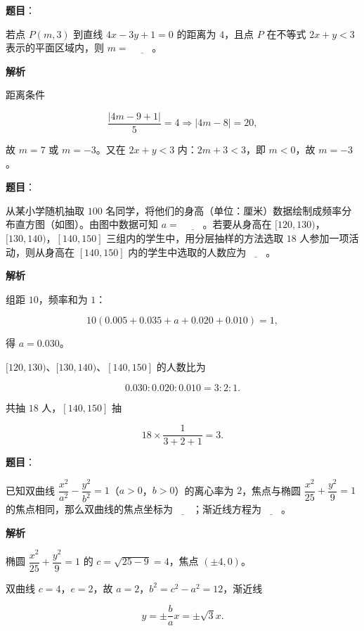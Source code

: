 \begin{answer}

\textbf{题目}：

若点 $P(m,3)$ 到直线 $4x-3y+1=0$ 的距离为 $4$，且点 $P$ 在不等式 $2x+y<3$ 表示的平面区域内，则 $m=$ $\underline{\qquad}$。

\textbf{解析}

距离条件

\nopagebreak[4]
\[\frac{|4m-9+1|}5=4\Longrightarrow|4m-8|=20,\]

故 $m=7$ 或 $m=-3$。又在 $2x+y<3$ 内：$2m+3<3$，即 $m<0$，故 $m=-3$。


\end{answer}
\begin{answer}

\textbf{题目}：

从某小学随机抽取 $100$ 名同学，将他们的身高（单位：厘米）数据绘制成频率分布直方图（如图）。由图中数据可知 $a=$ $\underline{\qquad}$。若要从身高在 $[120,130)$，$[130,140)$，$[140,150]$ 三组内的学生中，用分层抽样的方法选取 $18$ 人参加一项活动，则从身高在 $[140,150]$ 内的学生中选取的人数应为$\underline{\qquad}$。
\nopagebreak[4]
\begin{center}\end{center}
\nopagebreak[4]
\textbf{解析}

组距 $10$，频率和为 $1$：

\nopagebreak[4]
\[10(0.005+0.035+a+0.020+0.010)=1,\]

得 $a=0.030$。

$[120,130)$、$[130,140)$、$[140,150]$ 的人数比为

\nopagebreak[4]
\[0.030:0.020:0.010=3:2:1.\]

共抽 $18$ 人，$[140,150]$ 抽

\nopagebreak[4]
\[18\times\frac1{3+2+1}=3.\]


\end{answer}
\begin{answer}

\textbf{题目}：

已知双曲线 $\dfrac{x^2}{a^2}-\dfrac{y^2}{b^2}=1$（$a>0$，$b>0$）的离心率为 $2$，焦点与椭圆 $\dfrac{x^2}{25}+\dfrac{y^2}9=1$ 的焦点相同，那么双曲线的焦点坐标为$\underline{\qquad}$；渐近线方程为$\underline{\qquad}$。

\textbf{解析}

椭圆 $\dfrac{x^2}{25}+\dfrac{y^2}9=1$ 的 $c=\sqrt{25-9}=4$，焦点 $(\pm4,0)$。

双曲线 $c=4$，$e=2$，故 $a=2$，$b^2=c^2-a^2=12$，渐近线

\nopagebreak[4]
\[y=\pm\frac ba x=\pm\sqrt3x.\]


\end{answer}
